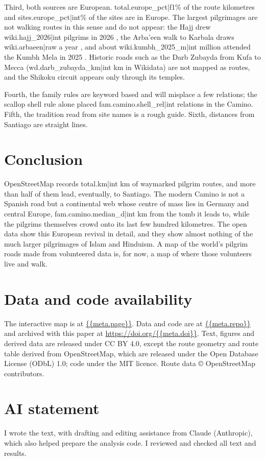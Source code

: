 \documentclass[11pt,a4paper]{article}
\begin{document}
Third, both sources are European. {{total.europe_pct|f1}}\% of the route kilometres and {{sites.europe_pct|int}}\% of the sites are in Europe. The largest pilgrimages are not walking routes in this sense and do not appear: the Hajj drew {{wiki.hajj_2026|int}} pilgrims in 2026 \citep{wikihajj}, the Arba'een walk to Karbala draws {{wiki.arbaeen|raw}} a year \citep{wikiarbaeen}, and about {{wiki.kumbh_2025_m|int}} million attended the Kumbh Mela in 2025 \citep{wikikumbh}. Historic roads such as the Darb Zubayda from Kufa to Mecca ({{wd.darb_zubayda_km|int}} km in Wikidata) are not mapped as routes, and the Shikoku circuit appears only through its temples.

Fourth, the family rules are keyword based and will misplace a few relations; the scallop shell rule alone placed {{fam.camino.shell_rel|int}} relations in the Camino. Fifth, the tradition read from site names is a rough guide. Sixth, distances from Santiago are straight lines.

\section{Conclusion}
OpenStreetMap records {{total.km|int}} km of waymarked pilgrim routes, and more than half of them lead, eventually, to Santiago. The modern Camino is not a Spanish road but a continental web whose centre of mass lies in Germany and central Europe, {{fam.camino.median_d|int}} km from the tomb it leads to, while the pilgrims themselves crowd onto its last few hundred kilometres. The open data show this European revival in detail, and they show almost nothing of the much larger pilgrimages of Islam and Hinduism. A map of the world's pilgrim roads made from volunteered data is, for now, a map of where those volunteers live and walk.

\section*{Data and code availability}
The interactive map is at \url{{{meta.page}}}. Data and code are at \url{{{meta.repo}}} and archived with this paper at \url{https://doi.org/{{meta.doi}}}. Text, figures and derived data are released under CC BY 4.0, except the route geometry and route table derived from OpenStreetMap, which are released under the Open Database License (ODbL) 1.0; code under the MIT licence. Route data © OpenStreetMap contributors.

\section*{AI statement}
I wrote the text, with drafting and editing assistance from Claude (Anthropic), which also helped prepare the analysis code. I reviewed and checked all text and results.
\end{document}

